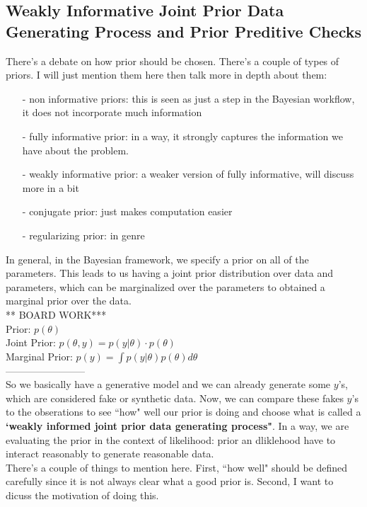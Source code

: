 \documentclass[]{article}
\begin{document}
\subsection*{Weakly Informative Joint Prior Data Generating Process and Prior Preditive Checks}
There's a debate on how prior should be chosen. There's a couple of types of priors. I will just mention them here then talk more in depth about them: 

\begin{itemize}
\item[-] non informative priors: this is seen as just a step in the Bayesian workflow, it does not incorporate much information
\item[-] fully informative prior: in a way, it strongly captures the information we have about the problem.
\item[-] weakly informative  prior: a weaker version of fully informative, will discuss more in a bit
\item[-] conjugate prior: just makes computation easier
\item[-] regularizing prior: in genre
\end{itemize}

\noindent In general, in the Bayesian framework, we specify a prior on all of the parameters. This leads to us having a joint prior distribution over data and parameters, which can be marginalized over the parameters to obtained a marginal prior over the data. \\

\noindent*** BOARD WORK*** \\
Prior: $ p(\theta)$ \\
Joint Prior: $p(\theta, y) = p(y | \theta) \cdot p(\theta)$ \\
Marginal Prior: $p(y) = \int p(y|\theta) p(\theta) d\theta$\\
------------------------\\
So we basically have a generative model and we can already generate some $y$'s, which are considered fake or synthetic data. Now, we can compare these fakes $y$'s to the obserations to see ``how" well our prior is doing and choose what is called a \textbf{`weakly informed joint prior data generating process"}. In a way, we are evaluating the prior in the context of likelihood: prior an dliklehood have to interact reasonably to generate reasonable data. \\There's a couple of things to mention here. First, ``how well" should be defined carefully since it is not always clear what a good prior is. Second, I want to dicuss the motivation of doing this. \\ 
\end{document}
